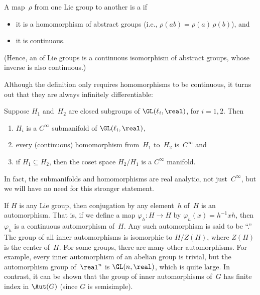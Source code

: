 \begin{defn}
 A map~$\rho$ from one Lie group to another is a  if%
		\begin{itemize}
		\item it is a homomorphism of abstract groups (i.e., $\rho(ab) = \rho(a) \, \rho(b)$), 
		and
		\item it is continuous.
		\end{itemize}
	(Hence, an  of Lie groups is a continuous isomorphism of abstract groups, whose inverse is also continuous.)
\end{defn}

Although the definition only requires homomorphisms to be continuous, it turns out that they are always infinitely differentiable:

\begin{prop} \label{HomosAreSmooth}
Suppose $H_1$ and~$H_2$ are closed subgroups of\/ $\GL(\ell_i,\real)$, for $i = 1,2$. Then
	\begin{enumerate}
	\item \label{HomosAreSmooth-subgrp}
	$H_i$ is a $C^\infty$ submanifold of\/ $\GL(\ell_i,\real)$,
	\item every\/ \textup(continuous\textup) homomorphism from~$H_1$ to~$H_2$ is~$C^\infty$
	and
	\item if $H_1 \subseteq H_2$, then the coset space $H_2/H_1$ is a $C^\infty$ manifold.
	\end{enumerate}
\end{prop}

\begin{rem}
In fact, the submanifolds and homomorphisms are real analytic, not just~$C^\infty$, but we will have no need for this stronger statement.
\end{rem}

\begin{rem} \label{OutGFinite}
If $H$ is any Lie group, then conjugation by any element~$h$ of~$H$ is an automorphism. That is, if we define a map $\varphi_h \colon H \to H$ by $\varphi_h(x) = h^{-1} x h$, then $\varphi_h$ is a continuous automorphism of~$H$. Any such automorphism is said to be ``\zz.'' The group of all inner automorphisms is isomorphic to $H/Z(H)$, where $Z(H)$ is the center of~$H$. For some groups, there are many other automorphisms. For example, every inner automorphism of an abelian group is trivial, but the automorphism group of~$\real^n$ is $\GL(n,\real)$, which is quite large. In contrast, it can be shown that the group of inner automorphisms of~$G$ has finite index in $\Aut(G)$ (since $G$ is semisimple).
\end{rem}

